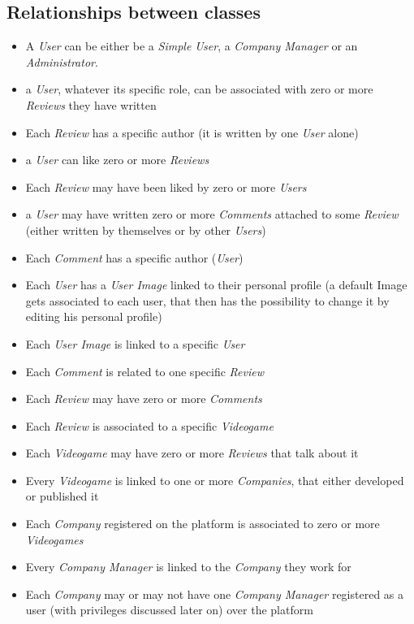 \subsection{Relationships between classes}
\begin{itemize}
    \item A \emph{User} can be either be a \emph{Simple User}, a \emph{Company Manager} or an \emph{Administrator}. 
    \item a \emph{User}, whatever its specific role, can be associated with zero or more \emph{Reviews} they have written
    \item Each \emph{Review} has a specific author (it is written by one \emph{User} alone)
    \item a \emph{User} can like zero or more \emph{Reviews}
    \item Each \emph{Review} may have been liked by zero or more \emph{Users}
    \item a \emph{User} may have written zero or more \emph{Comments} attached to some \emph{Review} (either written by themselves or by other \emph{Users})
    \item Each \emph{Comment} has a specific author (\emph{User})
    \item Each \emph{User} has a \emph{User Image} linked to their personal profile (a default Image gets associated to each user, that then has the possibility to change it by editing his personal profile)
    \item Each \emph{User Image} is linked to a specific \emph{User}
    \item Each \emph{Comment} is related to one specific \emph{Review}
    \item Each \emph{Review} may have zero or more \emph{Comments}
    \item Each \emph{Review} is associated to a specific \emph{Videogame} 
    \item Each \emph{Videogame} may have zero or more \emph{Reviews} that talk about it
    \item Every \emph{Videogame} is linked to one or more \emph{Companies}, that either developed or published it
    \item Each \emph{Company} registered on the platform is associated to zero or more \emph{Videogames} 
    \item Every \emph{Company Manager} is linked to the \emph{Company} they work for 
    \item Each \emph{Company} may or may not have one \emph{Company Manager} registered as a user (with privileges discussed later on) over the platform 
\end{itemize}
